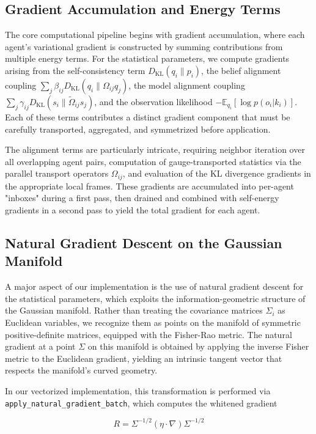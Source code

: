 \documentclass[twoside,11pt]{article}
\begin{document}
\subsection{Gradient Accumulation and Energy Terms}
The core computational pipeline begins with gradient accumulation, where each agent's variational gradient is constructed by summing contributions from multiple energy terms. For the statistical parameters, we compute gradients arising from the self-consistency term $D_{\text{KL}}(q_i \| p_i)$, the belief alignment coupling $\sum_j \beta_{ij} D_{\text{KL}}(q_i \| \Omega_{ij} q_j)$, the model alignment coupling $\sum_j \gamma_{ij} D_{\text{KL}}(s_i \| \tilde{\Omega}_{ij} s_j)$, and the observation likelihood $-\mathbb{E}_{q_i}[\log p(o_i | k_i)]$. Each of these terms contributes a distinct gradient component that must be carefully transported, aggregated, and symmetrized before application.

The alignment terms are particularly intricate, requiring neighbor iteration over all overlapping agent pairs, computation of gauge-transported statistics via the parallel transport operators $\Omega_{ij}$, and evaluation of the KL divergence gradients in the appropriate local frames. These gradients are accumulated into per-agent "inboxes" during a first pass, then drained and combined with self-energy gradients in a second pass to yield the total gradient for each agent.

\subsection{Natural Gradient Descent on the Gaussian Manifold}
A major aspect of our implementation is the use of natural gradient descent for the statistical parameters, which exploits the information-geometric structure of the Gaussian manifold. Rather than treating the covariance matrices $\Sigma_i$ as Euclidean variables, we recognize them as points on the manifold of symmetric positive-definite matrices, equipped with the Fisher-Rao metric. The natural gradient at a point $\Sigma$ on this manifold is obtained by applying the inverse Fisher metric to the Euclidean gradient, yielding an intrinsic tangent vector that respects the manifold's curved geometry.

In our vectorized implementation, this transformation is performed via \texttt{apply\_natural\_gradient\_batch}, which computes the whitened gradient

\begin{equation}
R = \Sigma^{-1/2} (\eta \cdot \nabla) \Sigma^{-1/2}
\end{equation}
\end{document}
